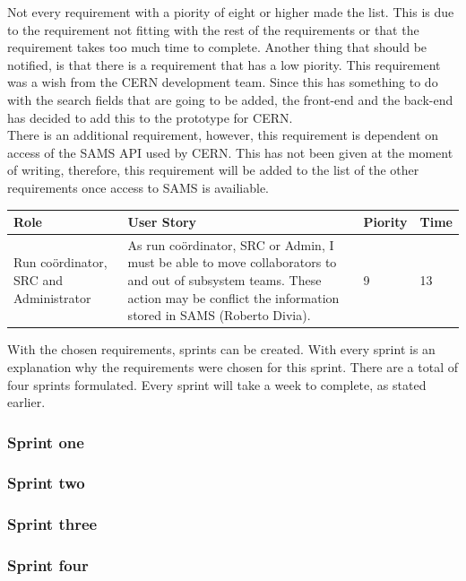 \documentclass[paper=a4, fontsize=11pt,twoside]{scrartcl}	%
\begin{document}
Not every requirement with a piority of eight or higher made the list. This is due to the requirement not fitting with the rest of the requirements or that the requirement takes too much time to complete. Another thing that should be notified, is that there is a requirement that has a low piority. This requirement was a wish from the CERN development team. Since this has something to do with the search fields that are going to be added, the front-end and the back-end has decided to add this to the prototype for CERN.   \\

There is an additional requirement, however, this requirement is dependent on access of the SAMS API used by CERN. This has not been given at the moment of writing, therefore, this requirement will be added to the list of the other requirements once access to SAMS is availiable. \\

\begin{longtable}{ | p{2cm} | p{8cm} | p{1.5cm} | l |}
\hline
Role & User Story & Piority & Time \\ \hline
Run coördinator, SRC and Administrator &  As run coördinator, SRC or Admin, I must be able to move collaborators to and out of subsystem teams. These action may be conflict the information stored in SAMS (Roberto Divia). & 9 & 13 \\ \hline
\end{longtable}

With the chosen requirements, sprints can be created. With every sprint is an explanation why the requirements were chosen for this sprint. There are a total of four sprints formulated. Every sprint will take a week to complete, as stated earlier.

\subsubsection{Sprint one}

\subsubsection{Sprint two}

\subsubsection{Sprint three}

\subsubsection{Sprint four}
\end{document}
